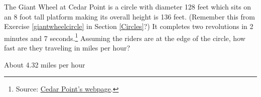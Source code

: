 \documentclass{ximera}
\begin{document}
\begin{problem}\label{giantwheelmotion}
    The Giant Wheel at Cedar Point is a circle with diameter 128 feet which sits on an 8 foot tall platform making its overall height is 136 feet.  (Remember this from Exercise \ref{giantwheelcircle} in Section \ref{Circles}?)  It completes two revolutions in 2 minutes and 7 seconds.\footnote{Source: \href{http://www.cedarpoint.com/public/park/rides/tranquil/giant_wheel.cfm}{\underline{Cedar Point's webpage}}.}  Assuming the riders are at the edge of the circle, how fast are they traveling in miles per hour?

\begin{solution}
About 4.32 miles per hour
\end{solution}

\end{problem}
\end{document}
